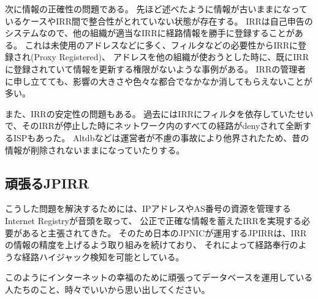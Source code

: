 次に情報の正確性の問題である。
先ほど述べたように情報が古いままになっているケースやIRR間で整合性がとれていない状態が存在する。
IRRは自己申告のシステムなので、他の組織が適当なIRRに経路情報を勝手に登録することがある。
これは未使用のアドレスなどに多く、フィルタなどの必要性からIRRに登録され(Proxy Registered)、
アドレスを他の組織が使おうとした時に、既にIRRに登録されていて情報を更新する権限がないような事例がある。
IRRの管理者に申し立てても、影響の大きさや色々な都合でなかなか消してもらえないことが多い。

また、IRRの安定性の問題もある。
過去にはIRRにフィルタを依存していたせいで、そのIRRが停止した時にネットワーク内のすべての経路がdenyされて全断するISPもあった。
Altdbなどは運営者が不慮の事故により他界されたため、昔の情報が削除されないままになっていたりする。

\subsection{頑張るJPIRR}

こうした問題を解決するためには、IPアドレスやAS番号の資源を管理するInternet Registryが音頭を取って、
公正で正確な情報を蓄えたIRRを実現する必要があると主張されてきた。
そのため日本のJPNICが運用するJPIRRは、IRRの情報の精度を上げるよう取り組みを続けており、
それによって経路奉行のような経路ハイジャック検知を可能としている。

このようにインターネットの幸福のために頑張ってデータベースを運用している人たちのこと、時々でいいから思い出してください。
